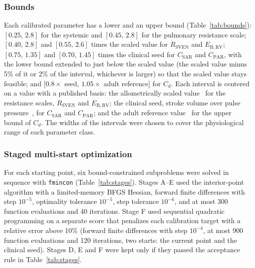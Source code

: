 \subsubsection{Bounds}
Each calibrated parameter has a lower and an upper bound (Table~\ref{tab:bounds}): $[0.25,\,2.8]$ for the systemic and $[0.45,\,2.8]$ for the pulmonary resistance scale; $[0.40,\,2.8]$ and $[0.55,\,2.6]$ times the scaled value for $R_{\mathrm{SVEN}}$ and $E_{\mathrm{B,RV}}$; $[0.75,\,1.35]$ and $[0.70,\,1.45]$ times the clinical seed for $C_{\mathrm{SAR}}$ and $C_{\mathrm{PAR}}$, with the lower bound extended to just below the scaled value (the scaled value minus 5\% of it or 2\% of the interval, whichever is larger) so that the scaled value stays feasible; and $[0.8\times$ seed, $1.05\times$ adult reference$]$ for $C_d$. Each interval is centered on a value with a published basis: the allometrically scaled value~\cite{zhang2019multiscale} for the resistance scales, $R_{\mathrm{SVEN}}$ and $E_{\mathrm{B,RV}}$; the clinical seed, stroke volume over pulse pressure~\cite{Colebank2026}, for $C_{\mathrm{SAR}}$ and $C_{\mathrm{PAR}}$; and the adult reference value~\cite{Valenti2023} for the upper bound of $C_d$. The widths of the intervals were chosen to cover the physiological range of each parameter class.

\subsubsection{Staged multi-start optimization}
For each starting point, six bound-constrained subproblems were solved in sequence with \texttt{fmincon} (Table~\ref{tab:stages}). Stages A--E used the interior-point algorithm with a limited-memory BFGS Hessian, forward finite differences with step $10^{-5}$, optimality tolerance $10^{-5}$, step tolerance $10^{-6}$, and at most 300 function evaluations and 40 iterations. Stage F used sequential quadratic programming on a separate score that penalizes each calibration target with a relative error above 10\% (forward finite differences with step $10^{-4}$, at most 900 function evaluations and 120 iterations, two starts: the current point and the clinical seed). Stages D, E and F were kept only if they passed the acceptance rule in Table~\ref{tab:stages}.

